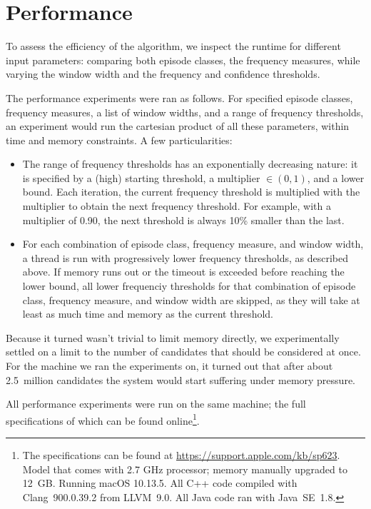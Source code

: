 \section{Performance}
\label{sec:performance}

To assess the efficiency of the algorithm, we inspect the runtime for different input parameters: comparing both episode classes, the frequency measures, while varying the window width and the frequency and confidence thresholds.

The performance experiments were ran as follows. For specified episode classes, frequency measures, a list of window widths, and a range of frequency thresholds, an experiment would run the cartesian product of all these parameters, within time and memory constraints. A few particularities:

\begin{itemize}
\item The range of frequency thresholds has an exponentially decreasing nature: it is specified by a (high) starting threshold, a multiplier $ \in (0, 1) $, and a lower bound. Each iteration, the current frequency threshold is multiplied with the multiplier to obtain the next frequency threshold. For example, with a multiplier of 0.90, the next threshold is always 10\% smaller than the last.
\item For each combination of episode class, frequency measure, and window width, a thread is run with progressively lower frequency thresholds, as described above. If memory runs out or the timeout is exceeded before reaching the lower bound, all lower frequenciy thresholds for that combination of episode class, frequency measure, and window width are skipped, as they will take at least as much time and memory as the current threshold.
\end{itemize}

Because it turned wasn't trivial to limit memory directly, we experimentally settled on a limit to the number of candidates that should be considered at once. For the machine we ran the experiments on, it turned out that after about 2.5~million candidates the system would start suffering under memory pressure.

All performance experiments were run on the same machine; the full specifications of which can be found online\footnote{The specifications can be found at \url{https://support.apple.com/kb/sp623}. Model that comes with 2.7 GHz processor; memory manually upgraded to 12~GB. Running macOS 10.13.5. All C++ code compiled with Clang~900.0.39.2 from LLVM~9.0. All Java code ran with Java~SE~1.8.}.


